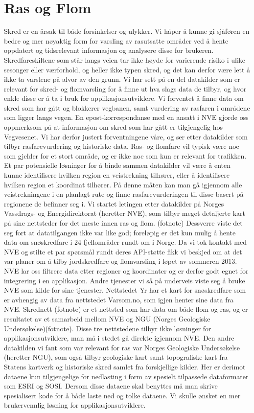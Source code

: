 \documentclass[a4paper,norsk,oneside]{book}
\begin{document}
\section{Ras og Flom}
 Skred er en årsak til både forsinkelser og ulykker. Vi håper å kunne gi sjåføren en bedre og mer nøyaktig form for varsling av rasutsatte områder ved å hente oppdatert og tidsrelevant informasjon og analysere disse for brukeren. Skredfareskiltene som står langs veien tar ikke høyde for varierende risiko i ulike sesonger eller værforhold, og heller ikke typen skred, og det kan derfor være lett å ikke ta varslene på alvor av den grunn.
    Vi har sett på en del datakilder som er relevant for skred- og flomvarsling for å finne ut hva slags data de tilbyr, og hvor enkle disse er å ta i bruk for applikasjonsutviklere. Vi forventet å finne data om skred som har gått og blokkerer vegbanen, samt vurdering av rasfaren i områdene som ligger langs vegen. En epost-korrespondanse med en ansatt i NVE gjorde oss oppmerksom på at informasjon om skred som har gått er tilgjengelig hos Vegvesenet. Vi har derfor justert forventningene våre, og ser etter datakilder som tilbyr rasfarevurdering og historiske data.
    Ras- og flomfare vil typisk være noe som gjelder for et stort område, og er ikke noe som kun er relevant for trafikken. Et par potensielle løsninger for å binde sammen datakilder vil være å enten kunne identifisere hvilken region en veistrekning tilhører, eller å identifisere hvilken region et koordinat tilhører. På denne måten kan man gå igjennom alle veistrekningene i en planlagt rute og finne rasfarevurderingen til disse basert på regionene de befinner seg i.
	Vi startet letingen etter datakilder på Norges Vassdrags- og Energidirektorat (heretter NVE), som tilbyr meget detaljerte kart på sine nettsteder for det meste innen ras og flom. (fotnote) Dessverre viste det seg fort at datatilgangen ikke var like god; foreløpig er det kun mulig å hente data om snøskredfare i 24 fjellområder rundt om i Norge. Da vi tok kontakt med NVE og stilte et par spørsmål rundt deres API-støtte fikk vi beskjed om at det var planer om å tilby jordskredfare og flomvarsling i løpet av sommeren 2013. NVE lar oss filtrere data etter regioner og koordinater og er derfor godt egnet for integrering i en applikasjon.
	Andre tjenester vi så på underveis viste seg å bruke NVE som kilde for sine tjenester. Nettstedet Yr har et kart for snøskredfare som er avhengig av data fra nettstedet Varsom.no, som igjen henter sine data fra NVE. Skrednett (fotnote) er et nettsted som har data om både flom og ras, og er resultatet av et samarbeid mellom NVE og NGU (Norges Geologiske Undersøkelse)(fotnote). Disse tre nettstedene tilbyr ikke løsninger for applikasjonsutviklere, man må i stedet gå direkte igjennom NVE.
	Den andre datakilden vi fant som var relevant for ras var Norges Geologiske Undersøkelse (heretter NGU), som også tilbyr geologiske kart samt topografiske kart fra Statens kartverk og historiske skred samlet fra forskjellige kilder. Her er derimot dataene kun tilgjengelige for nedlasting i form av spesielt tilpassede dataformater som ESRI og SOSI.  Dersom disse dataene skal benyttes må man skrive spesialisert kode for å både laste ned og tolke dataene. Vi skulle ønsket en mer brukervennlig løsning for applikasjonsutviklere.
\end{document}
